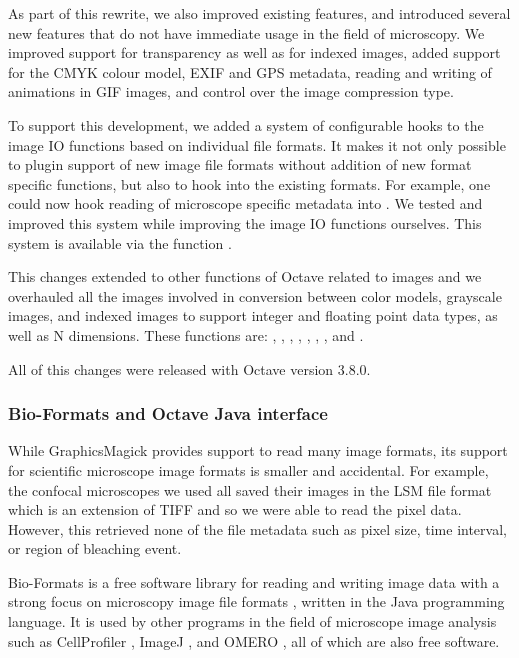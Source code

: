 As part of this rewrite, we also improved existing features, and
introduced several new features that do not have immediate usage in
the field of microscopy.  We improved support for transparency as well
as for indexed images, added support for the CMYK colour model, EXIF
and GPS metadata, reading and writing of animations in GIF images, and
control over the image compression type.

To support this development, we added a system of configurable hooks
to the image IO functions based on individual file formats.  It makes
it not only possible to plugin support of new image file formats
without addition of new format specific functions, but also to hook
into the existing formats.  For example, one could now hook reading of
microscope specific metadata into .  We tested and
improved this system while improving the image IO functions
ourselves.  This system is available via the function .

This changes extended to other functions of Octave related to images
and we overhauled all the images involved in conversion between color
models, grayscale images, and indexed images to support integer and
floating point data types, as well as N dimensions.  These functions
are: , , ,
, , ,
, and .

All of this changes were released with Octave version 3.8.0.


\subsubsection{Bio-Formats and Octave Java interface}

While GraphicsMagick provides support to read many image formats, its
support for scientific microscope image formats is smaller and
accidental.  For example, the confocal microscopes we used all saved
their images in the LSM file format which is an extension of TIFF and
so we were able to read the pixel data.  However, this retrieved none
of the file metadata such as pixel size, time interval, or region of
bleaching event.

Bio-Formats is a free software library for reading and writing image
data with a strong focus on microscopy image file formats
\citep{bioformats}, written in the Java programming language.  It is
used by other programs in the field of microscope image analysis such
as CellProfiler \citep{cellprofiler}, ImageJ \cite{imagej2}, and OMERO
\citep{omero}, all of which are also free software.

